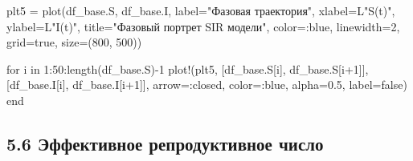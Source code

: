 \documentclass[
  12pt,
  a4paper,
  DIV=11,
  numbers=noendperiod]{scrreprt}
\newenvironment{Shaded}{\begin{snugshade}}{\end{snugshade}}
\newcommand{\ConstantTok}[1]{\textcolor[rgb]{0.56,0.35,0.01}{#1}}
\newcommand{\ControlFlowTok}[1]{\textcolor[rgb]{0.00,0.23,0.31}{#1}}
\newcommand{\FloatTok}[1]{\textcolor[rgb]{0.68,0.00,0.00}{#1}}
\newcommand{\FunctionTok}[1]{\textcolor[rgb]{0.28,0.35,0.67}{#1}}
\newcommand{\KeywordTok}[1]{\textcolor[rgb]{0.00,0.23,0.31}{#1}}
\newcommand{\NormalTok}[1]{\textcolor[rgb]{0.00,0.23,0.31}{#1}}
\newcommand{\OperatorTok}[1]{\textcolor[rgb]{0.37,0.37,0.37}{#1}}
\newcommand{\StringTok}[1]{\textcolor[rgb]{0.13,0.47,0.30}{#1}}
\begin{document}
\begin{Shaded}
\begin{Highlighting}[]
\NormalTok{plt5 }\OperatorTok{=} \FunctionTok{plot}\NormalTok{(df\_base.S, df\_base.I,}
\NormalTok{    label}\OperatorTok{=}\StringTok{"Фазовая траектория"}\NormalTok{,}
\NormalTok{    xlabel}\OperatorTok{=}\NormalTok{L}\StringTok{"S(t)"}\NormalTok{,}
\NormalTok{    ylabel}\OperatorTok{=}\NormalTok{L}\StringTok{"I(t)"}\NormalTok{,}
\NormalTok{    title}\OperatorTok{=}\StringTok{"Фазовый портрет SIR модели"}\NormalTok{,}
\NormalTok{    color}\OperatorTok{=:}\NormalTok{blue,}
\NormalTok{    linewidth}\OperatorTok{=}\FloatTok{2}\NormalTok{,}
\NormalTok{    grid}\OperatorTok{=}\ConstantTok{true}\NormalTok{,}
\NormalTok{    size}\OperatorTok{=}\NormalTok{(}\FloatTok{800}\NormalTok{, }\FloatTok{500}\NormalTok{))}

\ControlFlowTok{for}\NormalTok{ i }\KeywordTok{in} \FloatTok{1}\OperatorTok{:}\FloatTok{50}\OperatorTok{:}\FunctionTok{length}\NormalTok{(df\_base.S)}\OperatorTok{{-}}\FloatTok{1}
    \FunctionTok{plot!}\NormalTok{(plt5,}
\NormalTok{        [df\_base.S[i], df\_base.S[i}\OperatorTok{+}\FloatTok{1}\NormalTok{]],}
\NormalTok{        [df\_base.I[i], df\_base.I[i}\OperatorTok{+}\FloatTok{1}\NormalTok{]],}
\NormalTok{        arrow}\OperatorTok{=:}\NormalTok{closed, color}\OperatorTok{=:}\NormalTok{blue, alpha}\OperatorTok{=}\FloatTok{0.5}\NormalTok{, label}\OperatorTok{=}\ConstantTok{false}\NormalTok{)}
\ControlFlowTok{end}
\end{Highlighting}
\end{Shaded}

\subsection{5.6 Эффективное репродуктивное
число}\label{ux44dux444ux444ux435ux43aux442ux438ux432ux43dux43eux435-ux440ux435ux43fux440ux43eux434ux443ux43aux442ux438ux432ux43dux43eux435-ux447ux438ux441ux43bux43e}
\end{document}
